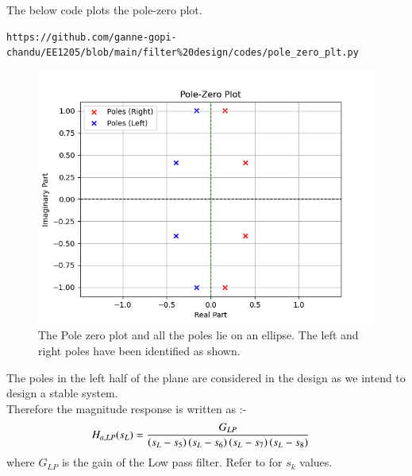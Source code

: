 \documentclass{article}
\begin{document}
\begin{enumerate}
The below code plots the pole-zero plot.
\begin{lstlisting}
https://github.com/ganne-gopi-chandu/EE1205/blob/main/filter%20design/codes/pole_zero_plt.py
\end{lstlisting}
\begin{figure}[H]
\centering
\includegraphics[width=1\columnwidth]{figs/Pole_Zero_plt.png}
\caption{The Pole zero plot and all the poles lie on an ellipse. The left and right poles have been identified as shown.}
\label{fig:pole_zero_plt}
\end{figure}
The poles in the left half of the plane are considered in the design as we intend to design a stable system.\\
Therefore the magnitude response is written as :- 
\begin{align}
    H_{a,LP}(s_L) &= \frac{G_{LP}}{\left(s_L-s_5\right)\left(s_L-s_6\right)\left(s_L-s_7\right)\left(s_L-s_8\right)}
\end{align}
where $G_{LP}$ is the gain of the Low pass filter. Refer to  for $s_k$ values.\\


\end{enumerate}
\end{document}
